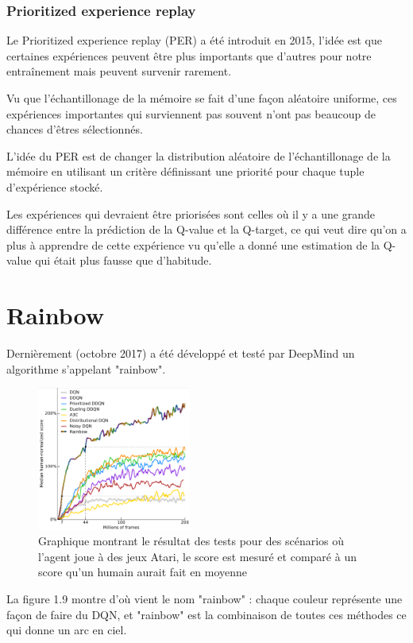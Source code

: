 \documentclass[a4paper,10pt,openany,oneside]{report}
\begin{document}
\subsubsection{Prioritized experience replay}
Le Prioritized experience replay (PER) a été introduit en 2015, l'idée est que certaines expériences peuvent être plus importants que d'autres pour notre entraînement mais peuvent survenir rarement.

Vu que l'échantillonage de la mémoire se fait d'une façon aléatoire uniforme, ces expériences importantes qui surviennent pas souvent n'ont pas beaucoup de chances d'êtres sélectionnés.

L'idée du PER est de changer la distribution aléatoire de l'échantillonage de la mémoire en utilisant un critère définissant une priorité pour chaque tuple d'expérience stocké.

Les expériences qui devraient être priorisées sont celles où il y a une grande différence entre la prédiction de la Q-value et la Q-target, ce qui veut dire qu'on a plus à apprendre de cette expérience vu qu'elle a donné une estimation de la Q-value qui était plus fausse que d'habitude.
\section{Rainbow}
Dernièrement (octobre 2017) a été développé et testé par DeepMind \cite[]{Rainbow} un algorithme s'appelant "rainbow".
\begin{figure}[H]
	\centering
	\includegraphics[width=0.45\textwidth]{img/rainbow.png}
	\caption{Graphique montrant le résultat des tests pour des scénarios où l'agent joue à des jeux Atari, le score est mesuré et comparé à un score qu'un humain aurait fait en moyenne \cite[]{Rainbow}}
\end{figure}

La figure 1.9 montre d'où vient le nom "rainbow" : chaque couleur représente une façon de faire du DQN, et "rainbow" est la combinaison de toutes ces méthodes ce qui donne un arc en ciel.
\end{document}
